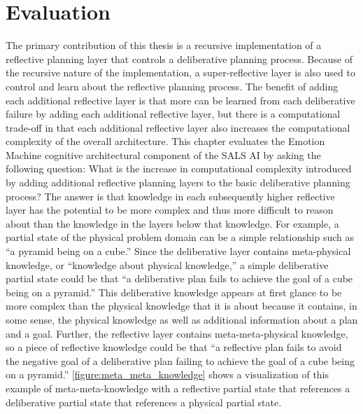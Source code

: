 \chapter{Evaluation}
\label{chapter:evaluation}

The primary contribution of this thesis is a recursive implementation
of a reflective planning layer that controls a deliberative planning
process.  Because of the recursive nature of the implementation, a
super-reflective layer is also used to control and learn about the
reflective planning process.  The benefit of adding each additional
reflective layer is that more can be learned from each deliberative
failure by adding each additional reflective layer, but there is a
computational trade-off in that each additional reflective layer also
increases the computational complexity of the overall architecture.
This chapter evaluates the Emotion Machine cognitive architectural
component of the SALS AI by asking the following question: What is the
increase in computational complexity introduced by adding additional
reflective planning layers to the basic deliberative planning process?
The answer is that knowledge in each subsequently higher reflective
layer has the potential to be more complex and thus more difficult to
reason about than the knowledge in the layers below that knowledge.
For example, a partial state of the physical problem domain can be a
simple relationship such as ``a pyramid being on a cube.''  Since the
deliberative layer contains meta-physical knowledge, or ``knowledge
about physical knowledge,'' a simple deliberative partial state could
be that ``a deliberative plan fails to achieve the goal of a cube
being on a pyramid.''  This deliberative knowledge appears at first
glance to be more complex than the physical knowledge that it is about
because it contains, in some sense, the physical knowledge as well as
additional information about a plan and a goal.  Further, the
reflective layer contains meta-meta-physical knowledge, so a piece of
reflective knowledge could be that ``a reflective plan fails to avoid
the negative goal of a deliberative plan failing to achieve the goal
of a cube being on a pyramid.''
{\mbox{\autoref{figure:meta_meta_knowledge}}} shows a visualization of
this example of meta-meta-knowledge with a reflective partial state
that references a deliberative partial state that references a
physical partial state.
